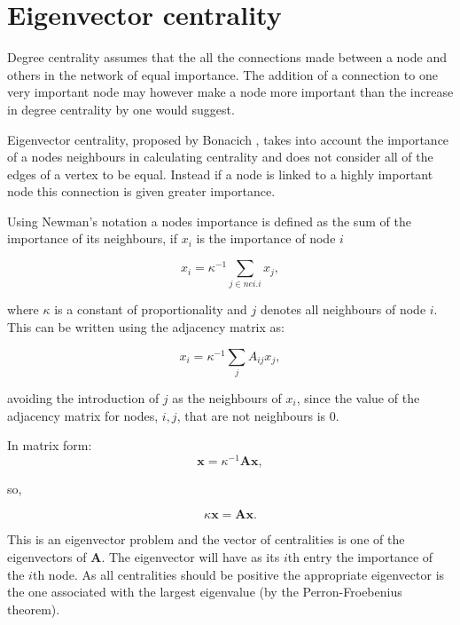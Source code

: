 \section{Eigenvector centrality}
Degree centrality assumes that the all the connections made between a node and others in the network  of equal importance.  The addition of a connection to one very important node may however make a node more important than the increase in degree centrality by one would suggest. 

Eigenvector centrality, proposed by Bonacich \cite{bonacich1972factoring}, takes into account the importance of a nodes neighbours in calculating centrality and does not consider all of the edges of a vertex to be equal. Instead if a node is linked to a highly important node this connection is given greater importance. 

Using Newman's notation \cite{newman2018networks} a nodes importance is defined as the sum of the importance of its neighbours, if $x_i$ is the importance of node $i$

\begin{equation}
    x_i = \kappa^{-1} \sum_{j\in nei. i} x_j,
\end{equation}

where $\kappa$ is a constant of proportionality and $j$ denotes all neighbours of node $i$. This can be written using the adjacency matrix as:

\begin{equation}
    x_i = \kappa^{-1} \sum_j A_{ij} x_j,
\end{equation}

avoiding the introduction of $j$ as the neighbours of $x_i$, since the value of the adjacency matrix for nodes, $i,j$, that are not neighbours is 0.

In matrix form:
\begin{equation}
    \mathbf{x}=\kappa^{-1}\mathbf{Ax},
    \end{equation}
    
    so,
    
    \begin{equation}
         \kappa\mathbf{x}=\mathbf{Ax}.
    \end{equation}
  
This is an eigenvector problem and the vector of centralities is one of the eigenvectors of $\mathbf{A}$. The eigenvector will have as its $i$th entry the importance of the $i$th node. As all centralities should be positive the appropriate eigenvector is the one associated with the largest eigenvalue (by the Perron-Froebenius theorem). 
  
